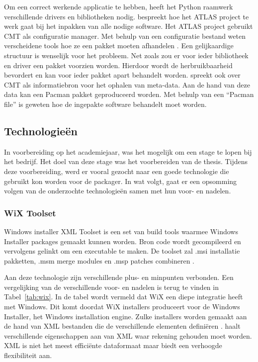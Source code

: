 Om een correct werkende applicatie te hebben, heeft het Python raamwerk verschillende drivers en bibliotheken nodig.
\citet{Obreshkov2008244} bespreekt hoe het ATLAS project te werk gaat bij het inpakken van alle nodige software.
Het ATLAS project gebruikt CMT als configuratie manager.
Met behulp van een configuratie bestand weten verscheidene tools hoe ze een pakket moeten afhandelen \citep{Obreshkov2008244}.
Een gelijkaardige structuur is wenselijk voor het probleem.
Net zoals \citet{Obreshkov2008244} zou er voor ieder bibliotheek en driver een pakket voorzien worden.
Hierdoor wordt de herbruikbaarheid bevordert en kan voor ieder pakket apart behandelt worden.
\citet{packAtlas} spreekt ook over CMT als informatiebron voor het ophalen van meta-data.
Aan de hand van deze data kan een Pacman pakket geproduceerd worden.
Met behulp van een ``Pacman file'' is geweten hoe de ingepakte software behandelt moet worden.

\subsection{Technologieën}
In voorbereiding op het academiejaar, was het mogelijk om een stage te lopen bij het bedrijf.
Het doel van deze stage was het voorbereiden van de thesis.
Tijdens deze voorbereiding, werd er vooral gezocht naar een goede technologie die gebruikt kon worden voor de packager.
In wat volgt, gaat er een opsomming volgen van de onderzochte technologieën samen met hun voor- en nadelen.

\subsubsection{WiX Toolset}
Windows installer XML Toolset is een set van build tools waarmee Windows Installer packages gemaakt kunnen worden.
Bron code wordt gecompileerd en vervolgens gelinkt om een executable te maken.
De toolset zal .msi installatie pakketten, .msm merge modules en .msp patches combineren \citep{wixToolset}.

Aan deze technologie zijn verschillende plus- en minpunten verbonden.
Een vergelijking van de verschillende voor- en nadelen is terug te vinden in Tabel~\ref{tab:wix}.
In de tabel wordt vermeld dat WiX een diepe integratie heeft met Windows.
Dit komt doordat WiX installers produceert voor de Windows Installer, het Windows installation engine.
Zulke installers worden gemaakt aan de hand van XML bestanden die de verschillende elementen definiëren  \citep{wixTutorial}.
\citet{xmill} haalt verschillende eigenschappen aan van XML waar rekening gehouden moet worden.
XML is niet het meest efficiënte dataformaat maar biedt een verhoogde flexibiliteit aan.

